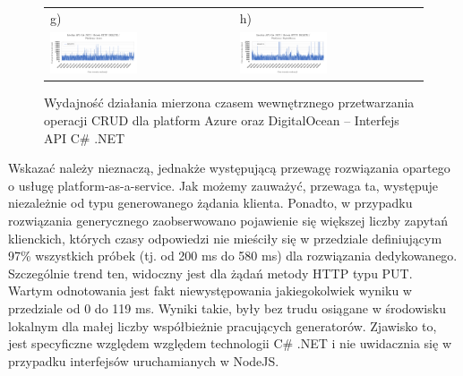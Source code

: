 \begin{figure}[htb]
\begin{tabular}{@{}ll@{}}
    g) & h) \\
    \includegraphics[width=0.49\textwidth]{rys05/dotnet-delete-azure.pdf} & \includegraphics[width=0.49\textwidth]{rys05/dotnet-delete-digitalocean.pdf} \\
	\end{tabular}
  \caption{Wydajność działania mierzona czasem wewnętrznego przetwarzania operacji CRUD dla platform Azure oraz DigitalOcean -- Interfejs API C\# .NET}
  \label{fig:dotnet-azure-vs-digitalocean}
\end{figure}

Wskazać należy nieznaczą, jednakże występującą przewagę rozwiązania opartego o usługę platform-as-a-service. Jak możemy zauważyć, przewaga ta, występuje niezależnie od typu generowanego żądania klienta. Ponadto, w przypadku rozwiązania generycznego zaobserwowano pojawienie się większej liczby zapytań klienckich, których czasy odpowiedzi nie mieściły się w przedziale definiującym 97\% wszystkich próbek (tj. od 200 ms do 580 ms) dla rozwiązania dedykowanego. Szczególnie trend ten, widoczny jest dla żądań metody HTTP typu PUT. Wartym odnotowania jest fakt niewystępowania jakiegokolwiek wyniku w przedziale od 0 do 119 ms. Wyniki takie, były bez trudu osiągane w środowisku lokalnym dla małej liczby współbieżnie pracujących generatorów. Zjawisko to, jest specyficzne względem względem technologii C\# .NET i nie uwidacznia się w przypadku interfejsów uruchamianych w NodeJS.

